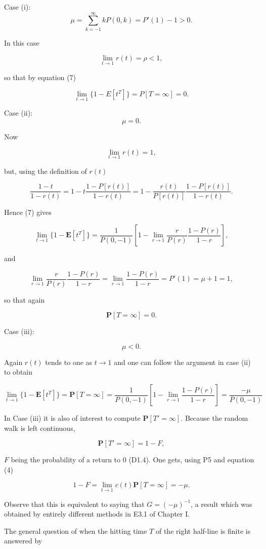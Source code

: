 Case (i): $$\mu = \sum_{k=-1}^{\infty} kP(0,k) = P'(1) - 1 > 0.$$

In this case

$$\lim_{t \to 1} r(t) = \rho < 1,$$

so that by equation (7)

$$\lim_{t \to 1} \{1 - E[t^T]\} = P[T = \infty] = 0.$$

Case (ii): $$\mu = 0.$$

Now

$$\lim_{t \to 1} r(t) = 1,$$

but, using the definition of $r(t)$

$$\frac{1 - t}{1 - r(t)} = 1 - t \frac{1 - P[r(t)]}{1 - r(t)} = 1 - \frac{r(t)}{P[r(t)]} \frac{1 - P[r(t)]}{1 - r(t)}.$$

Hence (7) gives

$$\lim_{t \to 1} \{1 - \mathbf{E}[t^T]\} = \frac{1}{P(0, -1)} \left[ 1 - \lim_{r \to 1} \frac{r}{P(r)} \frac{1 - P(r)}{1 - r} \right],$$

and

$$\lim_{r \to 1} \frac{r}{P(r)} \frac{1 - P(r)}{1 - r} = \lim_{r \to 1} \frac{1 - P(r)}{1 - r} = P'(1) = \mu + 1 = 1,$$

so that again

$$\mathbf{P}[T = \infty] = 0.$$

Case (iii):

$$\mu < 0.$$

Again $r(t)$ tends to one as $t \to 1$ and one can follow the argument in case (ii) to obtain

$$\lim_{t \to 1} \{1 - \mathbf{E}[t^T]\} = \mathbf{P}[T = \infty] = \frac{1}{P(0, -1)} \left[ 1 - \lim_{r \to 1} \frac{1 - P(r)}{1 - r} \right] = \frac{-\mu}{P(0, -1)}$$

In Case (iii) it is also of interest to compute $\mathbf{P}[T' = \infty]$. Because the random walk is left continuous,

$$\mathbf{P}[T' = \infty] = 1 - F,$$

$F$ being the probability of a return to 0 (D1.4). One gets, using P5 and equation (4)

$$1 - F = \lim_{t \to 1} c(t)\mathbf{P}[T = \infty] = -\mu.$$

Observe that this is equivalent to saying that $G = (-\mu)^{-1}$, a result which was obtained by entirely different methods in E3.1 of Chapter I.

The general question of when the hitting time $T$ of the right half-line is finite is answered by